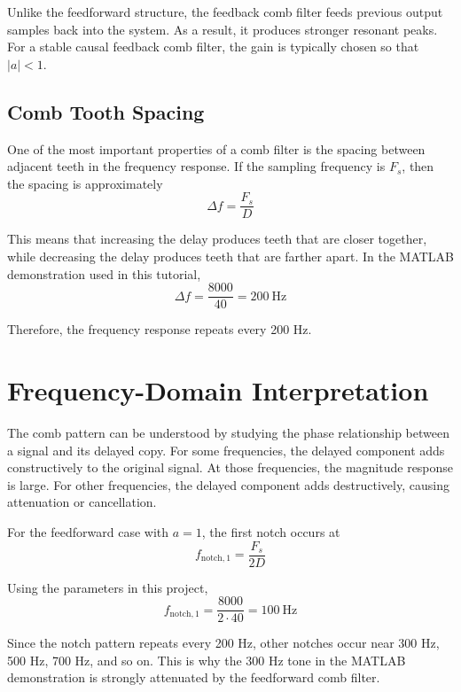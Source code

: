 \documentclass[11pt]{article}
\begin{document}
Unlike the feedforward structure, the feedback comb filter feeds previous output samples back into the system. As a result, it produces stronger resonant peaks. For a stable causal feedback comb filter, the gain is typically chosen so that $|a| < 1$.

\subsection{Comb Tooth Spacing}
One of the most important properties of a comb filter is the spacing between adjacent teeth in the frequency response. If the sampling frequency is $F_s$, then the spacing is approximately
\begin{equation}
    \Delta f = \frac{F_s}{D}
    \label{eq:comb_spacing}
\end{equation}

This means that increasing the delay produces teeth that are closer together, while decreasing the delay produces teeth that are farther apart. In the MATLAB demonstration used in this tutorial,
\begin{equation}
    \Delta f = \frac{8000}{40} = 200\ \text{Hz}
\end{equation}

Therefore, the frequency response repeats every 200 Hz.

\section{Frequency-Domain Interpretation}
The comb pattern can be understood by studying the phase relationship between a signal and its delayed copy. For some frequencies, the delayed component adds constructively to the original signal. At those frequencies, the magnitude response is large. For other frequencies, the delayed component adds destructively, causing attenuation or cancellation.

For the feedforward case with $a = 1$, the first notch occurs at
\begin{equation}
    f_{\mathrm{notch},1} = \frac{F_s}{2D}
\end{equation}

Using the parameters in this project,
\begin{equation}
    f_{\mathrm{notch},1} = \frac{8000}{2 \cdot 40} = 100\ \text{Hz}
\end{equation}

Since the notch pattern repeats every 200 Hz, other notches occur near 300 Hz, 500 Hz, 700 Hz, and so on. This is why the 300 Hz tone in the MATLAB demonstration is strongly attenuated by the feedforward comb filter.
\end{document}
